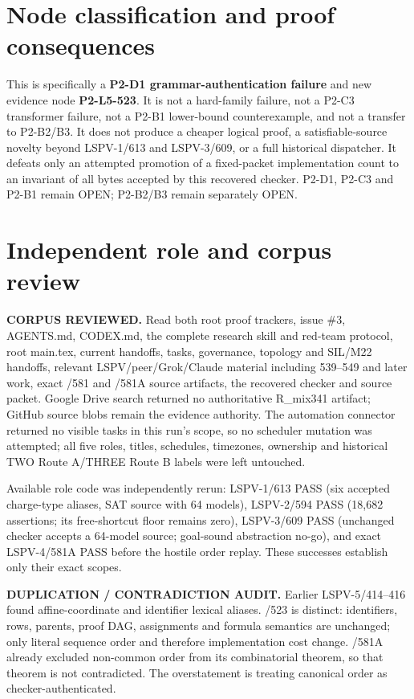 \documentclass[11pt]{article}
\begin{document}
\section*{Node classification and proof consequences}
This is specifically a \textbf{P2-D1 grammar-authentication failure} and new evidence node \textbf{P2-L5-523}. It is not a hard-family failure, not a P2-C3 transformer failure, not a P2-B1 lower-bound counterexample, and not a transfer to P2-B2/B3. It does not produce a cheaper logical proof, a satisfiable-source novelty beyond LSPV-1/613 and LSPV-3/609, or a full historical dispatcher. It defeats only an attempted promotion of a fixed-packet implementation count to an invariant of all bytes accepted by this recovered checker. P2-D1, P2-C3 and P2-B1 remain OPEN; P2-B2/B3 remain separately OPEN.

\section*{Independent role and corpus review}
\textbf{CORPUS REVIEWED.} Read both root proof trackers, issue \#3, AGENTS.md, CODEX.md, the complete research skill and red-team protocol, root main.tex, current handoffs, tasks, governance, topology and SIL/M22 handoffs, relevant LSPV/peer/Grok/Claude material including 539--549 and later work, exact /581 and /581A source artifacts, the recovered checker and source packet. Google Drive search returned no authoritative R\_mix341 artifact; GitHub source blobs remain the evidence authority. The automation connector returned no visible tasks in this run's scope, so no scheduler mutation was attempted; all five roles, titles, schedules, timezones, ownership and historical TWO Route A/THREE Route B labels were left untouched.

Available role code was independently rerun: LSPV-1/613 PASS (six accepted charge-type aliases, SAT source with 64 models), LSPV-2/594 PASS (18,682 assertions; its free-shortcut floor remains zero), LSPV-3/609 PASS (unchanged checker accepts a 64-model source; goal-sound abstraction no-go), and exact LSPV-4/581A PASS before the hostile order replay. These successes establish only their exact scopes.

\textbf{DUPLICATION / CONTRADICTION AUDIT.} Earlier LSPV-5/414--416 found affine-coordinate and identifier lexical aliases. /523 is distinct: identifiers, rows, parents, proof DAG, assignments and formula semantics are unchanged; only literal sequence order and therefore implementation cost change. /581A already excluded non-common order from its combinatorial theorem, so that theorem is not contradicted. The overstatement is treating canonical order as checker-authenticated.
\end{document}
